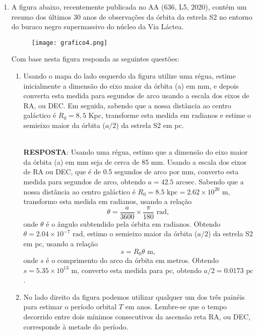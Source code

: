 \documentclass[a4paper,12pt]{article}
\begin{document}
\begin{enumerate}
\begin{enumerate}
\end{enumerate}

\noindent\hrulefill

\item A figura abaixo, recentemente publicada no AA (636, L5, 2020), contém um resumo dos últimos 30 anos de observações da órbita da estrela S2 no entorno do buraco negro supermassivo do núcleo da Via Láctea.

\begin{figure}[H]
    \centering
    \texttt{[image: grafico4.png]}
\end{figure}

Com base nesta figura responda as seguintes questões: 
\begin{enumerate}
\item Usando o mapa do lado esquerdo da figura utilize uma régua, estime inicialmente a dimensão do eixo maior da órbita (a) em mm, e depois converta esta medida para segundos de arco usando a escala dos eixos de RA, ou DEC. Em seguida, sabendo que a nossa distância ao centro galáctico é $R_0=8,5$ Kpc, transforme esta medida em radianos e estime o semieixo maior da órbita ($a/2$) da estrela S2 em pc.

\noindent\hrulefill\\\textbf{RESPOSTA}: Usando uma régua, estimo que a dimensão do eixo maior da órbita (a) em mm seja de cerca de 85 mm. Usando a escala dos eixos de RA ou DEC, que é de 0.5 segundos de arco por mm, converto esta medida para segundos de arco, obtendo $a = 42.5 \text{ arcsec}$. Sabendo que a nossa distância ao centro galáctico é $R_0 = 8.5 \text{ kpc} = 2.62 \times 10^{20} \text{ m}$, transformo esta medida em radianos, usando a relação $$\theta = \frac{a}{3600} \times \frac{\pi}{180} \text{ rad},$$ onde $\theta$ é o ângulo subtendido pela órbita em radianos. Obtendo $\theta = 2.04 \times 10^{-7} \text{ rad}$, estimo o semieixo maior da órbita ($a/2$) da estrela S2 em pc, usando a relação $$s = R_0\theta \text{ m},$$ onde $s$ é o comprimento do arco da órbita em metros. Obtendo $s = 5.35 \times 10^{13} \text{ m}$, converto esta medida para pc, obtendo $a/2 = 0.0173 \text{ pc}$.

\noindent\hrulefill

\item No lado direito da figura podemos utilizar qualquer um dos três painéis para estimar o período orbital $T$ em anos. Lembre-se que o tempo decorrido entre dois mínimos consecutivos da ascensão reta RA, ou DEC, corresponde à metade do período. 


\end{enumerate}
\end{enumerate}
\end{document}
